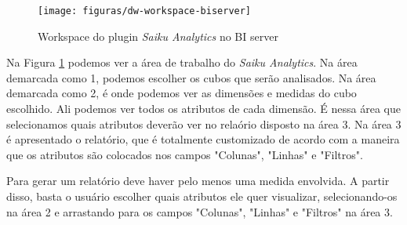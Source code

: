 \begin{figure}[H]
	\centering
	\texttt{[image: figuras/dw-workspace-biserver]}
	\caption{Workspace do plugin \emph{Saiku Analytics} no BI server}
	\label{dw-workspace-biserver}
\end{figure}


Na Figura \ref{dw-workspace-biserver} podemos ver a área de trabalho do \emph{Saiku Analytics}. Na área demarcada como 1, podemos escolher os cubos que serão analisados. Na área demarcada como 2, é onde podemos ver as dimensões e medidas do cubo escolhido. Ali podemos ver todos os atributos de cada dimensão. É nessa área que selecionamos quais atributos deverão ver no relaório disposto na área 3. Na área 3 é apresentado o relatório, que é totalmente customizado de acordo com a maneira que os atributos são colocados nos campos "Colunas", "Linhas" e "Filtros".


Para gerar um relatório deve haver pelo menos uma medida envolvida. A partir disso, basta o usuário escolher quais atributos ele quer visualizar, selecionando-os na área 2 e arrastando para os campos "Colunas", "Linhas" e "Filtros" na área 3.



